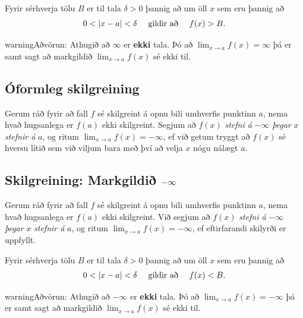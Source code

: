 \documentclass[b5paper,10pt,icelandic]{sphinxmanual}
\begin{document}
Fyrir sérhverja tölu \(B\) er til tala \(\delta>0\) þannig
að um öll \(x\) sem eru þannig að
\begin{gather}
\begin{split}0 < |x-a| <\delta \quad  \text{ gildir að } \quad f(x) > B.\end{split}\notag
\end{gather}
\begin{notice}{warning}{Aðvörun:}
Athugið að \(\infty\) er \textbf{ekki} tala. Þó að
\(\lim_{x\rightarrow a} f(x)=\infty\) þá er samt sagt að markgildið
\(\lim_{x\rightarrow a} f(x)\) sé ekki til.
\end{notice}


\subsection{Óformleg skilgreining}
\label{kafli02:id9}
Gerum ráð fyrir að fall \(f\) sé skilgreint á opnu bili umhverfis
punktinn \(a\), nema hvað hugsanlega er \(f(a)\) ekki
skilgreint. Segjum að \(f(x)\) \emph{stefni á} \(-\infty\) \emph{þegar}
\(x\) \emph{stefnir á} \(a\), og ritum
\(\lim_{x\rightarrow a} f(x)=-\infty\), ef við getum tryggt að
\(f(x)\) sé hversu lítið sem við viljum bara með því að velja
\(x\) nógu nálægt \(a\).


\subsection{Skilgreining: Markgildið \protect\(-\infty\protect\)}
\label{kafli02:id10}
Gerum ráð fyrir að fall \(f\) sé skilgreint á opnu bili umhverfis
punktinn \(a\), nema hvað hugsanlega er \(f(a)\) ekki
skilgreint. Við segjum að \(f(x)\) \emph{stefni á} \(-\infty\)
\emph{þegar} \(x\) \emph{stefnir á} \(a\), og ritum
\(\lim_{x\rightarrow a} f(x)=-\infty\), ef eftirfarandi skilyrði er
uppfyllt.

Fyrir sérhverja tölu \(B\) er til tala \(\delta>0\) þannig
að um öll \(x\) sem eru þannig að
\begin{gather}
\begin{split}0 < |x-a| < \delta \quad \text{ gildir að } \quad f(x)<B.\end{split}\notag
\end{gather}
\begin{notice}{warning}{Aðvörun:}
Athugið að \(-\infty\) er \textbf{ekki} tala. Þó að
\(\lim_{x\rightarrow a} f(x)=-\infty\) þá er samt sagt að markgildið
\(\lim_{x\rightarrow a} f(x)\) sé ekki til.
\end{notice}
\end{document}
